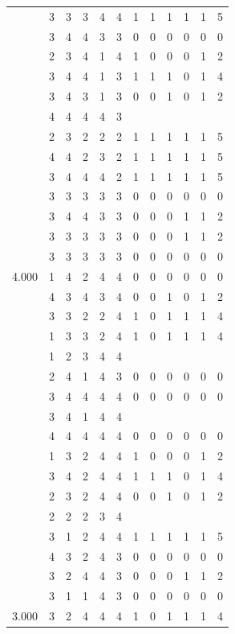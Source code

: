 \documentclass[]{msu-thesis}
\theoremstyle{definition}
\theoremstyle{definition}
\theoremstyle{definition}
\theoremstyle{remark}
\begin{document}
\begin{table}
{\begin{tabular}[t]{rrrrrrrrrrrr}
 & 3 & 3 & 3 & 4 & 4 & 1 & 1 & 1 & 1 & 1 & 5\\
 & 3 & 4 & 4 & 3 & 3 & 0 & 0 & 0 & 0 & 0 & 0\\
 & 2 & 3 & 4 & 1 & 4 & 1 & 0 & 0 & 0 & 1 & 2\\
 & 3 & 4 & 4 & 1 & 3 & 1 & 1 & 1 & 0 & 1 & 4\\
 & 3 & 4 & 3 & 1 & 3 & 0 & 0 & 1 & 0 & 1 & 2\\
 & 4 & 4 & 4 & 4 & 3 &  &  &  &  &  & \\
 & 2 & 3 & 2 & 2 & 2 & 1 & 1 & 1 & 1 & 1 & 5\\
 & 4 & 4 & 2 & 3 & 2 & 1 & 1 & 1 & 1 & 1 & 5\\
 & 3 & 4 & 4 & 4 & 2 & 1 & 1 & 1 & 1 & 1 & 5\\
 & 3 & 3 & 3 & 3 & 3 & 0 & 0 & 0 & 0 & 0 & 0\\
 & 3 & 4 & 4 & 3 & 3 & 0 & 0 & 0 & 1 & 1 & 2\\
 & 3 & 3 & 3 & 3 & 3 & 0 & 0 & 0 & 1 & 1 & 2\\
 & 3 & 3 & 3 & 3 & 3 & 0 & 0 & 0 & 0 & 0 & 0\\
4.000 & 1 & 4 & 2 & 4 & 4 & 0 & 0 & 0 & 0 & 0 & 0\\
 & 4 & 3 & 4 & 3 & 4 & 0 & 0 & 1 & 0 & 1 & 2\\
 & 3 & 3 & 2 & 2 & 4 & 1 & 0 & 1 & 1 & 1 & 4\\
 & 1 & 3 & 3 & 2 & 4 & 1 & 0 & 1 & 1 & 1 & 4\\
 & 1 & 2 & 3 & 4 & 4 &  &  &  &  &  & \\
 & 2 & 4 & 1 & 4 & 3 & 0 & 0 & 0 & 0 & 0 & 0\\
 & 3 & 4 & 4 & 4 & 4 & 0 & 0 & 0 & 0 & 0 & 0\\
 & 3 & 4 & 1 & 4 & 4 &  &  &  &  &  & \\
 & 4 & 4 & 4 & 4 & 4 & 0 & 0 & 0 & 0 & 0 & 0\\
 & 1 & 3 & 2 & 4 & 4 & 1 & 0 & 0 & 0 & 1 & 2\\
 & 3 & 4 & 2 & 4 & 4 & 1 & 1 & 1 & 0 & 1 & 4\\
 & 2 & 3 & 2 & 4 & 4 & 0 & 0 & 1 & 0 & 1 & 2\\
 & 2 & 2 & 2 & 3 & 4 &  &  &  &  &  & \\
 & 3 & 1 & 2 & 4 & 4 & 1 & 1 & 1 & 1 & 1 & 5\\
 & 4 & 3 & 2 & 4 & 3 & 0 & 0 & 0 & 0 & 0 & 0\\
 & 3 & 2 & 4 & 4 & 3 & 0 & 0 & 0 & 1 & 1 & 2\\
 & 3 & 1 & 1 & 4 & 3 & 0 & 0 & 0 & 0 & 0 & 0\\
3.000 & 3 & 2 & 4 & 4 & 4 & 1 & 0 & 1 & 1 & 1 & 4\\

\end{tabular}}
\end{table}
\end{document}
